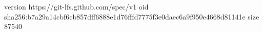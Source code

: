 version https://git-lfs.github.com/spec/v1
oid sha256:b7a29a14cbf6cb857dff6888e1d76fffd7775f3e0daec6a9f950e4668d81141e
size 87540

